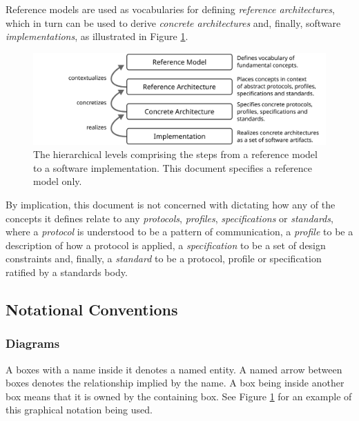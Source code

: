 Reference models are used as vocabularies for defining \textit{reference architectures}, which in turn can be used to derive \textit{concrete architectures} and, finally, software \textit{implementations}, as illustrated in Figure \ref{fig:model-implementation-hierarchy}.

\begin{figure}[ht]
  \centering
  \includegraphics{figures/model-implementation-hierarchy}
  \caption{
    The hierarchical levels comprising the steps from a reference model to a software implementation.
    This document specifies a reference model only.
  }
  \label{fig:model-implementation-hierarchy}
\end{figure}

By implication, this document is not concerned with dictating how any of the concepts it defines relate to any \textit{protocols}, \textit{profiles}, \textit{specifications} or \textit{standards}, where a \textit{protocol} is understood to be a pattern of communication, a \textit{profile} to be a description of how a protocol is applied, a \textit{specification} to be a set of design constraints and, finally, a \textit{standard} to be a protocol, profile or specification ratified by a standards body.

\newpage

\subsection{Notational Conventions}
\label{sec:introduction:conventions}

\subsubsection{Diagrams}

A boxes with a name inside it denotes a named entity.
A named arrow between boxes denotes the relationship implied by the name.
A box being inside another box means that it is owned by the containing box.
See Figure \ref{fig:model-implementation-hierarchy} for an example of this graphical notation being used.

